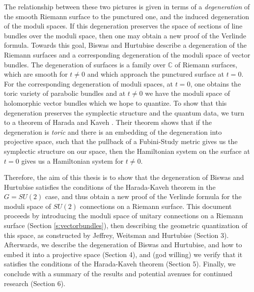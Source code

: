 	The relationship between these two pictures is given in terms of a \textit{degeneration} of the smooth Riemann surface to the punctured one, and the induced degeneration of the moduli spaces. If this degeneration preserves the space of sections of line bundles over the moduli space, then one may obtain a new proof of the Verlinde formula. Towards this goal, Biswas and Hurtubise \cite{biswas_degenerations_2021} describe a degeneration of the Riemann surfaces and a corresponding degeneration of the moduli space of vector bundles. The degeneration of surfaces is a family over $\mathbb{C}$ of Riemann surfaces, which are smooth for $t\neq0$ and which approach the punctured surface at $t=0$. For the corresponding degeneration of moduli spaces, at $t=0$, one obtains the toric variety of parabolic bundles and at $t\neq 0$ we have the moduli space of holomorphic vector bundles which we hope to quantize. To show that this degeneration preserves the symplectic structure and the quantum data, we turn to a theorem of Harada and Kaveh \cite{harada_integrable_2015}. Their theorem shows that if the degeneration is \textit{toric} and there is an embedding of the degeneration into projective space, such that the pullback of a Fubini-Study metric gives us the symplectic structure on our space, then the Hamiltonian system on the surface at $t=0$ gives us a Hamiltonian system for $t\neq 0$. 
	
	Therefore, the aim of this thesis is to show that the degeneration of Biswas and Hurtubise satisfies the conditions of the Harada-Kaveh theorem in the $G=SU(2)$ case, and thus obtain a new proof of the Verlinde formula for the moduli space of $SU(2)$ connections on a Riemann surface. This document proceeds by introducing the moduli space of unitary connections on a Riemann surface (Section \ref{s:vectorbundles}), then describing the geometric quantization of this space, as constructed by Jeffrey, Weitsman and Hurtubise (Section 3). Afterwards, we describe the degeneration of Biswas and Hurtubise, and how to embed it into a projective space (Section 4), and (god willing) we verify that it satisfies the conditions of the Harada-Kaveh theorem (Section 5). Finally, we conclude with a summary of the results and potential avenues for continued research (Section 6).

